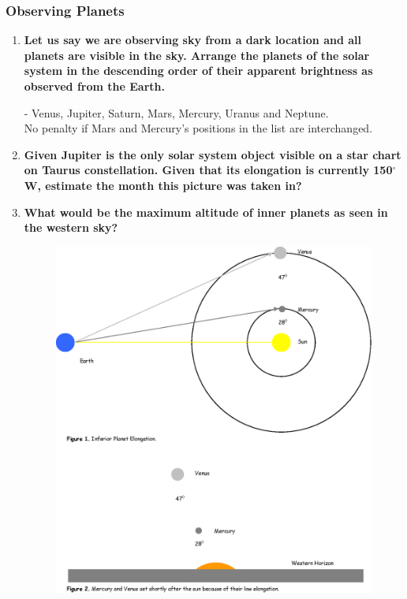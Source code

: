 \documentclass[a4paper,12pt]{extarticle}
\begin{document}
\subsubsection{Observing Planets}

\begin{enumerate}
	\item \textbf{Let us say we are observing sky from a dark location and all planets are visible in the sky. Arrange the planets of the solar system in the descending order of their apparent brightness as observed from the Earth.}
\begin{sol}
	- Venus, Jupiter, Saturn, Mars, Mercury, Uranus and Neptune.\\
No penalty if Mars and Mercury’s positions in the list are interchanged.	
\end{sol}
	\item \textbf{Given Jupiter is the only solar system object visible on a star chart on Taurus constellation. Given that its elongation is currently 150$^\circ$W, estimate the month this picture was taken in?}
	\item \textbf{What would be the maximum altitude of inner planets as seen in the western sky?}
	\begin{figure}[H]
		\centering
		\includegraphics[width=0.6\linewidth]{elong_planets.eps}
	\end{figure}


\end{enumerate}
\end{document}

